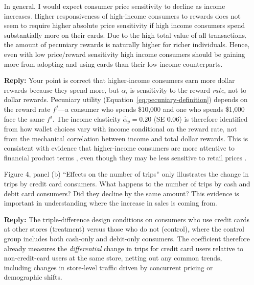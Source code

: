 \documentclass[main.tex]{subfiles}
\begin{document}
\begin{refsection}
\begin{refcommentnoclear}
In general, I would expect consumer price sensitivity to decline as income increases.
Higher responsiveness of high-income consumers to rewards does not seem to require higher absolute price sensitivity if high income consumers spend substantially more on their cards.
Due to the high total value of all transactions, the amount of pecuniary rewards is naturally higher for richer individuals.
Hence, even with low price/reward sensitivity high income consumers should be gaining more from adopting and using cards than their low income counterparts.

\end{refcommentnoclear}

\textbf{Reply:} Your point is correct that higher-income consumers earn more dollar rewards because they spend more, but $\alpha_i$ is sensitivity to the reward \textit{rate}, not to dollar rewards.
Pecuniary utility (Equation~\ref{eq:pecuniary-definition}) depends on the reward rate $f^j$---a consumer who spends \$10{,}000 and one who spends \$1{,}000 face the same $f^j$.
The income elasticity $\hat{\alpha}_y = 0.20$ (SE $0.06$) is therefore identified from how wallet choices vary with income conditional on the reward rate, not from the mechanical correlation between income and total dollar rewards.
This is consistent with evidence that higher-income consumers are more attentive to financial product terms \parencite{Hastings.etal2017}, even though they may be less sensitive to retail prices \parencite{Sangani2024}.

\begin{refcommentnoclear}
Figure 4, panel (b) ``Effects on the number of trips'' only illustrates the change in trips by credit card consumers.
What happens to the number of trips by cash and debit card consumers?
Did they decline by the same amount?
This evidence is important in understanding where the increase in sales is coming from.
\end{refcommentnoclear}

\textbf{Reply:} The triple-difference design conditions on consumers who use credit cards at other stores (treatment) versus those who do not (control), where the control group includes both cash-only and debit-only consumers.
The coefficient therefore already measures the \emph{differential} change in trips for credit card users relative to non-credit-card users at the same store, netting out any common trends, including changes in store-level traffic driven by concurrent pricing or demographic shifts.


\end{refsection}
\end{document}
